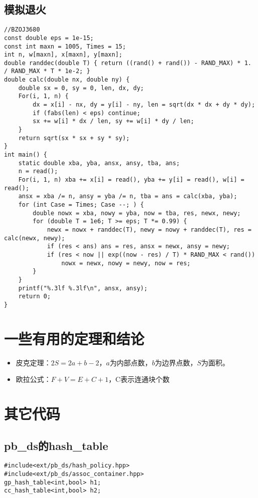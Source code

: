 \documentclass[twocolumn,a4]{article}
\begin{document}
\subsection{模拟退火}
\begin{lstlisting}
//BZOJ3680
const double eps = 1e-15;
const int maxn = 1005, Times = 15;
int n, w[maxn], x[maxn], y[maxn];
double randdec(double T) { return ((rand() + rand()) - RAND_MAX) * 1. / RAND_MAX * T * 1e-2; }
double calc(double nx, double ny) {
    double sx = 0, sy = 0, len, dx, dy;
    For(i, 1, n) {
        dx = x[i] - nx, dy = y[i] - ny, len = sqrt(dx * dx + dy * dy);
        if (fabs(len) < eps) continue;
        sx += w[i] * dx / len, sy += w[i] * dy / len;
    }
    return sqrt(sx * sx + sy * sy);
}
int main() {
    static double xba, yba, ansx, ansy, tba, ans;
    n = read();
    For(i, 1, n) xba += x[i] = read(), yba += y[i] = read(), w[i] = read();
    ansx = xba /= n, ansy = yba /= n, tba = ans = calc(xba, yba);
    for (int Case = Times; Case --; ) {
        double nowx = xba, nowy = yba, now = tba, res, newx, newy;
        for (double T = 1e6; T >= eps; T *= 0.99) {
            newx = nowx + randdec(T), newy = nowy + randdec(T), res = calc(newx, newy);
            if (res < ans) ans = res, ansx = newx, ansy = newy;
            if (res < now || exp((now - res) / T) * RAND_MAX < rand())
                nowx = newx, nowy = newy, now = res;
        }
    }
    printf("%.3lf %.3lf\n", ansx, ansy);
    return 0;
}
\end{lstlisting}


\section{一些有用的定理和结论}
\begin{itemize}
\item 皮克定理：$2S=2a+b-2$，$a$为内部点数，$b$为边界点数，$S$为面积。
\item 欧拉公式：$F+V=E+C+1$，C表示连通块个数
\end{itemize}

\section{其它代码}
\subsection{pb\_ds的hash\_table}
\begin{lstlisting}
#include<ext/pb_ds/hash_policy.hpp>
#include<ext/pb_ds/assoc_container.hpp>
gp_hash_table<int,bool> h1;
cc_hash_table<int,bool> h2;
\end{lstlisting}
\end{document}
